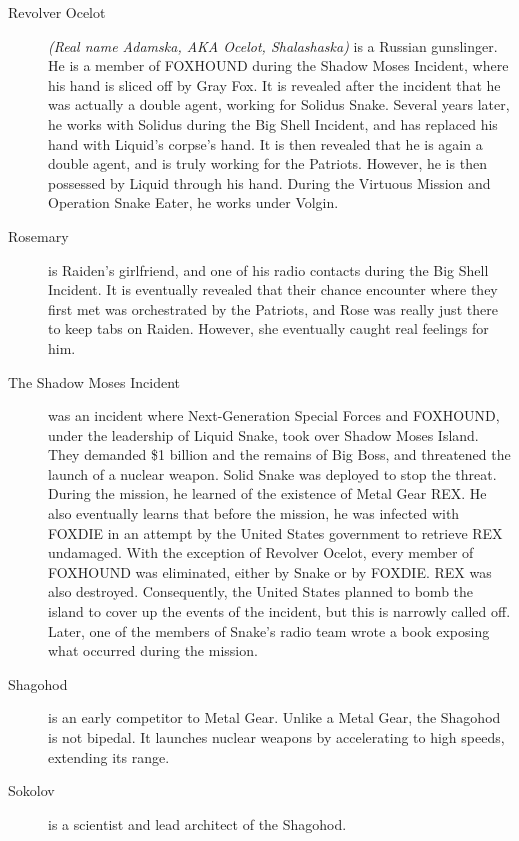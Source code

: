 \documentclass[12pt]{article}
\begin{document}
\begin{description}
	\item [Revolver Ocelot] \textit{(Real name Adamska, AKA Ocelot,
		Shalashaska)} is a Russian gunslinger. He is a member of
		FOXHOUND during the Shadow Moses Incident, where his hand is
		sliced off by Gray Fox. It is revealed after the incident that
		he was actually a double agent, working for Solidus Snake.
		Several years later, he works with Solidus during the Big Shell
		Incident, and has replaced his hand with Liquid's corpse's
		hand. It is then revealed that he is again a double agent, and
		is truly working for the Patriots. However, he is then
		possessed by Liquid through his hand. During the Virtuous
		Mission and Operation Snake Eater, he works under Volgin.

	\item [Rosemary] is Raiden's girlfriend, and one of his radio contacts
		during the Big Shell Incident. It is eventually revealed that
		their chance encounter where they first met was orchestrated by
		the Patriots, and Rose was really just there to keep tabs on
		Raiden. However, she eventually caught real feelings for him.

	\item [The Shadow Moses Incident] was an incident where Next-Generation
		Special Forces and FOXHOUND, under the leadership of Liquid
		Snake, took over Shadow Moses Island. They demanded \$1
		billion and the remains of Big Boss, and threatened the launch
		of a nuclear weapon. Solid Snake was deployed to stop the
		threat. During the mission, he learned of the existence of
		Metal Gear REX. He also eventually learns that before the
		mission, he was infected with FOXDIE in an attempt by the
		United States government to retrieve REX undamaged. With the
		exception of Revolver Ocelot, every member of FOXHOUND was
		eliminated, either by Snake or by FOXDIE. REX was also
		destroyed. Consequently, the United States planned to bomb the
		island to cover up the events of the incident, but this is
		narrowly called off. Later, one of the members of Snake's radio
		team wrote a book exposing what occurred during the mission.

	\item [Shagohod] is an early competitor to Metal Gear. Unlike a Metal
		Gear, the Shagohod is not bipedal. It launches nuclear weapons
		by accelerating to high speeds, extending its range.
	
	\item [Sokolov] is a scientist and lead architect of the Shagohod.


\end{description}
\end{document}
